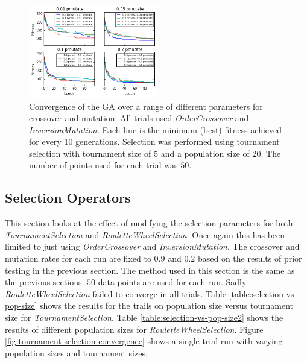 \documentclass[journal]{IEEEtran}
\begin{document}
\begin{figure}[H]
\centering
\includegraphics[width=0.5\textwidth]{figures/cross_vs_mutate_params_convergence.png}
\caption{Convergence of the GA over a range of different parameters for crossover and mutation. All trials used \textit{OrderCrossover} and \textit{InversionMutation}. Each line is the minimum (best) fitness achieved for every 10 generations. Selection was performed using tournament selection with tournament size of $5$ and a population size of $20$. The number of points used for each trial was $50$.}
\label{fig:cross-vs-mutate-params}
\end{figure}

\subsection{Selection Operators}
\label{subsec:selection-parameters}
This section looks at the effect of modifying the selection parameters for both \textit{TournamentSelection} and \textit{RouletteWheelSelection}. Once again this has been limited to just using \textit{OrderCrossover} and \textit{InversionMutation}. The crossover and mutation rates for each run are fixed to $0.9$ and $0.2$ based on the results of prior testing in the previous section. The method used in this section is the same as the previous sections. $50$ data points are used for each run. Sadly \textit{RouletteWheelSelection} failed to converge in all trials. Table \ref{table:selection-vs-pop-size} shows the results for the trails on population size versus tournament size for \textit{TournamentSelection}. Table \ref{table:selection-vs-pop-size2} shows the results of different population sizes for \textit{RouletteWheelSelection}. Figure \ref{fig:tournament-selection-convergence} shows a single trial run with varying population sizes and tournament sizes.
\end{document}
